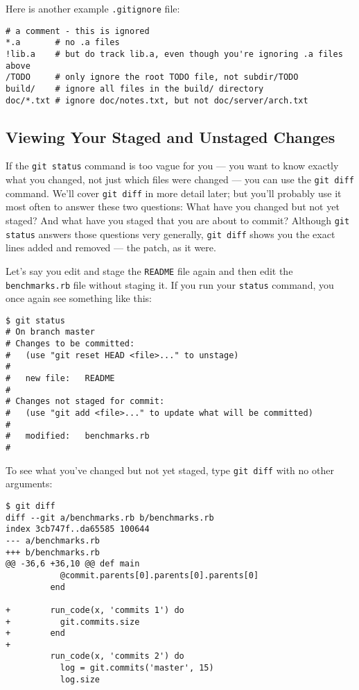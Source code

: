 \documentclass[a4paper]{book}
\begin{document}
Here is another example \texttt{.gitignore} file:

\begin{shaded}\begin{verbatim}
# a comment - this is ignored
*.a       # no .a files
!lib.a    # but do track lib.a, even though you're ignoring .a files above
/TODO     # only ignore the root TODO file, not subdir/TODO
build/    # ignore all files in the build/ directory
doc/*.txt # ignore doc/notes.txt, but not doc/server/arch.txt
\end{verbatim}\end{shaded}

\subsection{Viewing Your Staged and Unstaged Changes}

If the \texttt{git status} command is too vague for you --- you want to know exactly what you changed, not just which files were changed --- you can use the \texttt{git diff} command. We'll cover \texttt{git diff} in more detail later; but you'll probably use it most often to answer these two questions: What have you changed but not yet staged? And what have you staged that you are about to commit? Although \texttt{git status} answers those questions very generally, \texttt{git diff} shows you the exact lines added and removed --- the patch, as it were.

Let's say you edit and stage the \texttt{README} file again and then edit the \texttt{benchmarks.rb} file without staging it. If you run your \texttt{status} command, you once again see something like this:

\begin{shaded}\begin{verbatim}
$ git status
# On branch master
# Changes to be committed:
#   (use "git reset HEAD <file>..." to unstage)
#
#	new file:   README
#
# Changes not staged for commit:
#   (use "git add <file>..." to update what will be committed)
#
#	modified:   benchmarks.rb
#
\end{verbatim}\end{shaded}

To see what you've changed but not yet staged, type \texttt{git diff} with no other arguments:

\begin{shaded}\begin{verbatim}
$ git diff
diff --git a/benchmarks.rb b/benchmarks.rb
index 3cb747f..da65585 100644
--- a/benchmarks.rb
+++ b/benchmarks.rb
@@ -36,6 +36,10 @@ def main
           @commit.parents[0].parents[0].parents[0]
         end

+        run_code(x, 'commits 1') do
+          git.commits.size
+        end
+
         run_code(x, 'commits 2') do
           log = git.commits('master', 15)
           log.size
\end{verbatim}\end{shaded}
\end{document}
